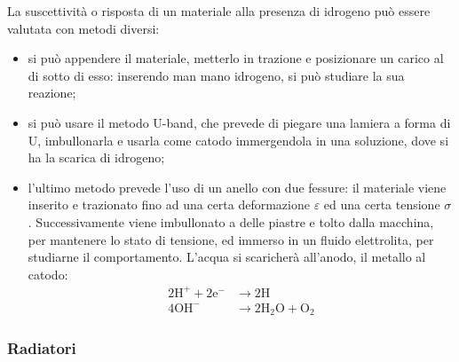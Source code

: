 La suscettività o risposta di un materiale alla presenza di idrogeno può essere valutata con
metodi diversi:
\begin{itemize}
    \item si può appendere il materiale, metterlo in trazione e posizionare un carico al di sotto di esso:
inserendo man mano idrogeno, si può studiare la sua reazione;
\item si può usare il metodo U-band, che prevede di piegare una lamiera a forma di U, imbullonarla
e usarla come catodo immergendola in una soluzione, dove si ha la scarica di idrogeno;
\item l’ultimo metodo prevede l’uso di un anello con due fessure: il materiale viene inserito e
trazionato fino ad una certa deformazione $\varepsilon$ ed una certa tensione $\sigma$. Successivamente viene imbullonato a delle piastre e tolto dalla macchina, per mantenere lo stato di tensione, ed immerso in un fluido elettrolita, per studiarne il comportamento. L’acqua si scaricherà all’anodo, il metallo al catodo: 
\begin{align*}
    \mathrm{2H^+ + 2e^-}&\to \mathrm{2H}\\
    \mathrm{4OH^-}&\to \mathrm{2H_2O + O_2}
\end{align*}
\end{itemize}

\subsubsection{Radiatori} 

